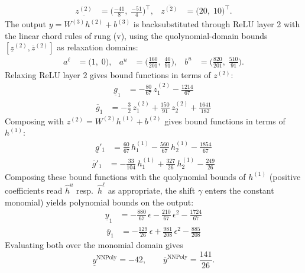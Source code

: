 \documentclass[11pt]{article}
\begin{document}
\begin{align*}
\underline{z^{(2)}} &= \bigl(\frac{-41}{8},\; \frac{-51}{4}\bigr)^{\!\top}, & \overline{z^{(2)}} &= \bigl(20,\; 10\bigr)^{\!\top}.
\end{align*}
The output $y = W^{(3)} h^{(2)} + b^{(3)}$ is backsubstituted through ReLU layer 2 with the linear chord rules of rung (v), using the quolynomial-domain bounds
$[\underline{z}^{(2)}, \overline{z}^{(2)}]$ as relaxation domains:
\begin{align*}
a^{\ell} &= \bigl(1,\; 0\bigr), & a^{u} &= \bigl(\frac{160}{201},\; \frac{40}{91}\bigr), & b^{u} &= \bigl(\frac{820}{201},\; \frac{510}{91}\bigr).
\end{align*}
Relaxing ReLU layer 2 gives bound functions in terms of $z^{(2)}$:
\begin{align*}
\underline{g}_{1} &= -\frac{80}{67}\,z^{(2)}_{1} - \frac{1214}{67}
\end{align*}
\begin{align*}
\overline{g}_{1} &= -\frac{3}{2}\,z^{(2)}_{1} + \frac{150}{91}\,z^{(2)}_{2} + \frac{1641}{182}
\end{align*}
Composing with $z^{(2)} = W^{(2)} h^{(1)} + b^{(2)}$ gives bound functions in terms of $h^{(1)}$:
\begin{align*}
\underline{g}'_{1} &= \frac{60}{67}\,h^{(1)}_{1} - \frac{560}{67}\,h^{(1)}_{2} - \frac{1854}{67}
\end{align*}
\begin{align*}
\overline{g}'_{1} &= -\frac{33}{104}\,h^{(1)}_{1} + \frac{327}{26}\,h^{(1)}_{2} - \frac{249}{26}
\end{align*}
Composing these bound functions with the quolynomial bounds of $h^{(1)}$ (positive
coefficients read $\hat{h}^{u}$ resp.\ $\hat{h}^{\ell}$ as appropriate, the shift $\gamma$ enters the
constant monomial) yields polynomial bounds on the output:
\begin{align*}
\underline{y}_{1} &= -\frac{880}{67}\,\epsilon - \frac{210}{67}\,\epsilon^2 - \frac{1724}{67}
\end{align*}
\begin{align*}
\overline{y}_{1} &= -\frac{129}{26}\,\epsilon + \frac{981}{208}\,\epsilon^2 - \frac{885}{208}
\end{align*}
Evaluating both over the monomial domain gives
\begin{equation*}
\underline{y}^{\text{NNPoly}} = -42, \qquad \overline{y}^{\text{NNPoly}} = \frac{141}{26}.
\end{equation*}
\end{document}
